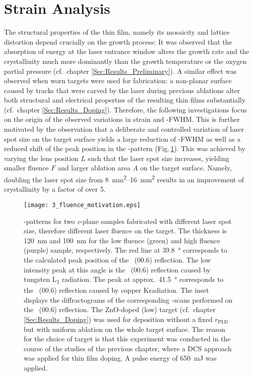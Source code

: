 \section{Strain Analysis}
    \label{Sec:Results_Energy}
The structural properties of the thin film, namely its mosaicity and lattice distortion depend crucially on the growth process:
It was observed that the absorption of energy at the laser entrance window alters the growth rate and the crystallinity much more dominantly than the growth temperature or the oxygen partial pressure (cf.\ chapter \ref{Sec:Results_Preliminary}).
A similar effect was observed when worn targets were used for fabrication:
a non-planar surface caused by tracks that were carved by the laser during previous ablations alter both structural and electrical properties of the resulting thin films substantially (cf.\ chapter \ref{Sec:Results_Doping}).
Therefore, the following investigations focus on the origin of the observed variations in strain and \textomega-FWHM.
This is further motivated by the observation that a deliberate and controlled variation of laser spot size on the target surface yields a large reduction of \textomega-FWHM as well as a reduced shift of the peak position in the \thetaomega-pattern (Fig.\,\ref{Fig:Results_3_motivation}).
This was achieved by varying the lens position $L$ such that the laser spot size increases, yielding smaller fluence $F$ and larger ablation area $A$ on the target surface.
Namely, doubling the laser spot size from \qtyrange{8}{16}{\mm\squared} results in an improvement of crystallinity by a factor of over 5.
\begin{figure}[h]
    \centering
    \texttt{[image: 3\_fluence\_motivation.eps]}
    \caption{
    \thetaomega-patterns for two \textit{c}-plane samples fabricated with different laser spot size, therefore different laser fluence on the target.
    The thickness is \qty{120}{\nm} and \qty{100}{\nm} for the low fluence (green) and high fluence (purple) sample, respectively.
    The red line at \qty{39.8}{\degree} corresponds to the calculated peak position of the \cro\ (00.6) reflection.
    The low intensity peak at this angle is the \alo\ (00.6) reflection caused by tungsten L\textalpha\textsubscript{1} radiation.
    The peak at approx.\ \qty{41.5}{\degree} corresponds to the \alo\ (00.6) reflection caused by copper K\textalpha radiation.
    The inset displays the diffractograms of the corresponding \textomega-scans performed on the \cro\ (00.6) reflection.
    The ZnO-doped (low) target (cf.\ chapter \ref{Sec:Results_Doping}) was used for deposition without a fixed $r_\mathrm{PLD}$ but with uniform ablation on the whole target surface.
    The reason for the choice of target is that this experiment was conducted in the course of the studies of the previous chapter, where a DCS approach was applied for thin film doping.
    A pulse energy of \qty{650}{\milli\J} was applied.
    }
    \label{Fig:Results_3_motivation}
\end{figure}

